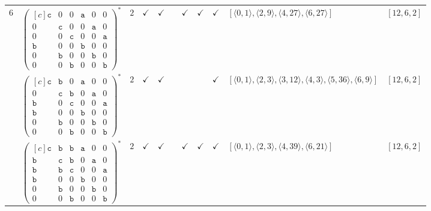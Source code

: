 \documentclass[12pt]{article}
\theoremstyle{definition}
\theoremstyle{plain}
\begin{document}
{\begin{longtable}{@{}cYcccccccZc@{}}

$6$
& $\begin{pmatrix*}[c]
\mathtt{c}  &  0  &  0  &  \mathtt{a}  &  0  &  0  \\
0  &  \mathtt{c}  &  0  &  0  &  \mathtt{a}  &  0  \\
0  &  0  &  \mathtt{c}  &  0  &  0  &  \mathtt{a}  \\
\mathtt{b}  &  0  &  0  &  \mathtt{b}  &  0  &  0  \\
0  &  \mathtt{b}  &  0  &  0  &  \mathtt{b}  & 0   \\
0  &  0  &  \mathtt{b}  &  0  &  0   &  \mathtt{b}
\end{pmatrix*}^*$
& $2$
& $\checkmark$
& $\checkmark$
&
& $\checkmark$
& $\checkmark$
& $\checkmark$
& $[\langle0,1\rangle,\allowbreak\langle2,9\rangle,\allowbreak\langle4,27\rangle,\allowbreak\langle6,27\rangle]$
& $[12,6,2]$     \\

\cmidrule(lr){2-11}

& $\begin{pmatrix*}[c]
\mathtt{c}  &  \mathtt{b}  &  0  &  \mathtt{a}  &  0  &  0  \\
0  &  \mathtt{c}  &  \mathtt{b}  &  0  &  \mathtt{a}  &  0  \\
\mathtt{b}  &  0  &  \mathtt{c}  &  0  &  0  &  \mathtt{a}  \\
\mathtt{b}  &  0  &  0  &  \mathtt{b}  &  0  &  0  \\
0  &  \mathtt{b}  &  0  &  0  &  \mathtt{b}  & 0   \\
0  &  0  &  \mathtt{b}  &  0  &  0   &  \mathtt{b}
\end{pmatrix*}^*$
& $2$
& $\checkmark$
& $\checkmark$
&
&
&
& $\checkmark$
& $[\langle0,1\rangle,\allowbreak\langle2,3\rangle,\allowbreak\langle3,12\rangle,\allowbreak\langle4,3\rangle,\allowbreak\langle5,36\rangle,\allowbreak\langle6,9\rangle]$
& $[12,6,2]$ \\

\cmidrule(lr){2-11}

& $\begin{pmatrix*}[c]
\mathtt{c}  &  \mathtt{b}  &  \mathtt{b}  &  \mathtt{a}  &  0  &  0  \\
\mathtt{b}  &  \mathtt{c}  &  \mathtt{b}  &  0  &  \mathtt{a}  &  0  \\
\mathtt{b}  &  \mathtt{b}  &  \mathtt{c}  &  0  &  0  &  \mathtt{a}  \\
\mathtt{b}  &  0  &  0  &  \mathtt{b}  &  0  &  0  \\
0  &  \mathtt{b}  &  0  &  0  &  \mathtt{b}  & 0   \\
0  &  0  &  \mathtt{b}  &  0  &  0   &  \mathtt{b}
\end{pmatrix*}^*$
& $2$
& $\checkmark$
& $\checkmark$
&
& $\checkmark$
& $\checkmark$
& $\checkmark$
& $[\langle0,1\rangle,\allowbreak\langle2,3\rangle,\allowbreak\langle4,39\rangle,\allowbreak\langle6,21\rangle]$
& $[12,6,2]$     \\


\end{longtable}}
\end{document}
